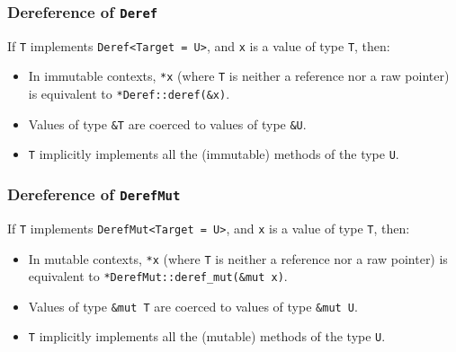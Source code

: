 \documentclass[aspectratio=1610,t]{beamer}
\begin{document}

\begin{frame}[fragile]
\frametitle{Dereference of \texttt{Deref}}
If \texttt{T} implements \texttt{Deref<Target = U>}, and \texttt{x} is a value of type \texttt{T}, then:

\begin{itemize}
    \item In immutable contexts, \texttt{*x} (where \texttt{T} is neither a reference nor a raw pointer) is equivalent to \texttt{*Deref::deref(\&x)}.
    \item Values of type \texttt{\&T} are coerced to values of type \texttt{\&U}.
    \item \texttt{T} implicitly implements all the (immutable) methods of the type \texttt{U}.
\end{itemize}
\end{frame}


\begin{frame}[fragile]
\frametitle{Dereference of \texttt{DerefMut}}
If \texttt{T} implements \texttt{DerefMut<Target = U>}, and \texttt{x} is a value of type \texttt{T}, then:

\begin{itemize}
    \item In mutable contexts, \texttt{*x} (where \texttt{T} is neither a reference nor a raw pointer) is equivalent to \texttt{*DerefMut::deref\_mut(\&mut x)}.
    \item Values of type \texttt{\&mut T} are coerced to values of type \texttt{\&mut U}.
    \item \texttt{T} implicitly implements all the (mutable) methods of the type \texttt{U}.
\end{itemize}
\end{frame}

\end{document}
